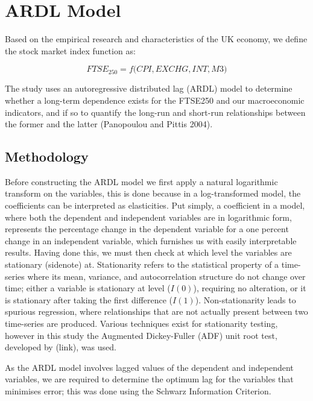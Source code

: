 \documentclass[11pt,a4paper]{article}
\begin{document}
\section{ARDL Model}

Based on the empirical research and characteristics of the UK economy, we 
define the stock market index function as:

\begin{equation}
    FTSE_{250} = f\biggl(CPI, EXCHG, INT, M3\biggr)
\end{equation}

The study uses an autoregressive distributed lag (ARDL) model to determine 
whether a long-term dependence exists for the FTSE250 and our macroeconomic 
indicators, and if so to quantify the long-run and short-run relationships
between the former and the latter (Panopoulou and Pittis 2004).

\subsection{Methodology}

Before constructing the ARDL model we first apply a natural logarithmic transform
on the variables, this is done because in a log-transformed model,
the coefficients can be interpreted as elasticities. Put simply, 
a coefficient in a model, where both the dependent and independent variables
are in logarithmic form, represents the percentage change in the 
dependent variable for a one percent change in an independent variable, 
which furnishes us with easily interpretable results. Having done this,
we must then check at which level the variables are stationary (sidenote) at.
Stationarity refers to the statistical property of a time-series where 
its mean, variance, and autocorrelation structure do not change over time; 
either a variable is stationary at level ($I(0)$), requiring no alteration,
or it is stationary after taking the first difference ($I(1)$). 
Non-stationarity leads to spurious regression, where relationships that 
are not actually present between two time-series are produced. Various
techniques exist for stationarity testing, however in this study the 
Augmented Dickey-Fuller (ADF) unit root test, developed by (link), was used. 

As the ARDL model involves lagged values of the dependent and independent 
variables, we are required to determine the optimum lag for the variables 
that minimises error; this was done using the Schwarz
Information Criterion.
\end{document}
